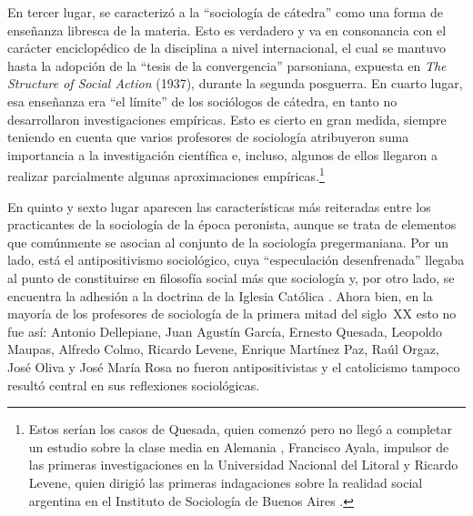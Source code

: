 En tercer lugar, se caracterizó a la \enquote{sociología de cátedra} como una forma de enseñanza libresca de la materia. Esto es verdadero y va en consonancia con el carácter enciclopédico de la disciplina a nivel internacional, el cual se mantuvo hasta la adopción de la \enquote{tesis de la convergencia} parsoniana, expuesta en \emph{The Structure of Social Action} (1937), durante la segunda posguerra. En cuarto lugar, esa enseñanza era \enquote{el límite} de los sociólogos de cátedra, en tanto no desarrollaron investigaciones empíricas. Esto es cierto en gran medida, siempre teniendo en cuenta que varios profesores de sociología atribuyeron suma importancia a la investigación científica e, incluso, algunos de ellos llegaron a realizar parcialmente algunas aproximaciones empíricas.\footnote{Estos serían los casos de Quesada, quien comenzó pero no llegó a completar un estudio sobre la clase media en Alemania \parencite{1667-PEREYRA2000}, Francisco Ayala, impulsor de las primeras investigaciones en la Universidad Nacional del Litoral \parencite{1619-ESCOBAR2011} y Ricardo Levene, quien dirigió las primeras indagaciones sobre la realidad social argentina en el Instituto de Sociología de Buenos Aires \parencite{1670-GONZALEZBOLLO1999}.}

En quinto y sexto lugar aparecen las características más reiteradas entre los practicantes de la sociología de la época peronista, aunque se trata de elementos que comúnmente se asocian al conjunto de la sociología pregermaniana. Por un lado, está el antipositivismo sociológico, cuya \enquote{especulación desenfrenada} llegaba al punto de constituirse en filosofía social más que sociología \parencite{1682-GERMANI1962} y, por otro lado, se encuentra la adhesión a la doctrina de la Iglesia Católica \parencite{1565-BLANCO2006}. Ahora bien, en la mayoría de los profesores de sociología de la primera mitad del siglo~XX esto no fue así: Antonio Dellepiane, Juan Agustín García, Ernesto Quesada, Leopoldo Maupas, Alfredo Colmo, Ricardo Levene, Enrique Martínez Paz, Raúl Orgaz, José Oliva y José María Rosa no fueron antipositivistas y el catolicismo tampoco resultó central en sus reflexiones sociológicas.

